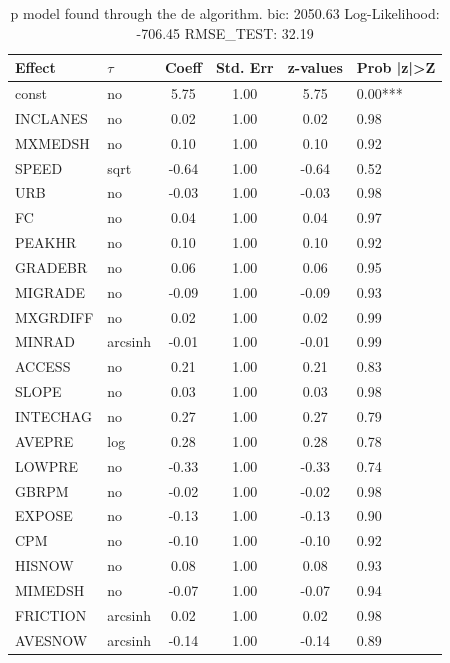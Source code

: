 \begin{table}
	\caption{p model found through the de algorithm. bic: 2050.63 Log-Likelihood: -706.45 RMSE_TEST: 32.19}
	\begin{center}
		\begin{tabular}{|l|l|c|c|c|l|}
			\hline
			Effect & $\tau$ & Coeff & Std. Err & z-values & Prob |z|>Z \\
			\hline
			const & no & 5.75 & 1.00 & 5.75 & 0.00*** \\
			\hline
			INCLANES & no & 0.02 & 1.00 & 0.02 & 0.98 \\
			\hline
			MXMEDSH & no & 0.10 & 1.00 & 0.10 & 0.92 \\
			\hline
			SPEED & sqrt & -0.64 & 1.00 & -0.64 & 0.52 \\
			\hline
			URB & no & -0.03 & 1.00 & -0.03 & 0.98 \\
			\hline
			FC & no & 0.04 & 1.00 & 0.04 & 0.97 \\
			\hline
			PEAKHR & no & 0.10 & 1.00 & 0.10 & 0.92 \\
			\hline
			GRADEBR & no & 0.06 & 1.00 & 0.06 & 0.95 \\
			\hline
			MIGRADE & no & -0.09 & 1.00 & -0.09 & 0.93 \\
			\hline
			MXGRDIFF & no & 0.02 & 1.00 & 0.02 & 0.99 \\
			\hline
			MINRAD & arcsinh & -0.01 & 1.00 & -0.01 & 0.99 \\
			\hline
			ACCESS & no & 0.21 & 1.00 & 0.21 & 0.83 \\
			\hline
			SLOPE & no & 0.03 & 1.00 & 0.03 & 0.98 \\
			\hline
			INTECHAG & no & 0.27 & 1.00 & 0.27 & 0.79 \\
			\hline
			AVEPRE & log & 0.28 & 1.00 & 0.28 & 0.78 \\
			\hline
			LOWPRE & no & -0.33 & 1.00 & -0.33 & 0.74 \\
			\hline
			GBRPM & no & -0.02 & 1.00 & -0.02 & 0.98 \\
			\hline
			EXPOSE & no & -0.13 & 1.00 & -0.13 & 0.90 \\
			\hline
			CPM & no & -0.10 & 1.00 & -0.10 & 0.92 \\
			\hline
			HISNOW & no & 0.08 & 1.00 & 0.08 & 0.93 \\
			\hline
			MIMEDSH & no & -0.07 & 1.00 & -0.07 & 0.94 \\
			\hline
			FRICTION & arcsinh & 0.02 & 1.00 & 0.02 & 0.98 \\
			\hline
			AVESNOW & arcsinh & -0.14 & 1.00 & -0.14 & 0.89 \\

\end{tabular}
\end{center}
\end{table}

